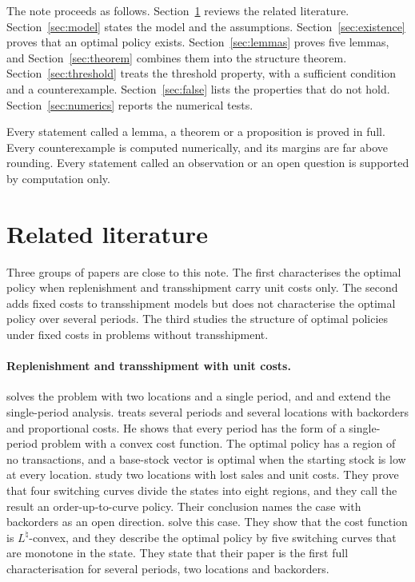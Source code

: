 \documentclass[11pt]{article}
\theoremstyle{definition}
\begin{document}
The note proceeds as follows. Section~\ref{sec:literature} reviews the related literature. Section~\ref{sec:model} states the model and the assumptions. Section~\ref{sec:existence} proves that an optimal policy exists. Section~\ref{sec:lemmas} proves five lemmas, and Section~\ref{sec:theorem} combines them into the structure theorem. Section~\ref{sec:threshold} treats the threshold property, with a sufficient condition and a counterexample. Section~\ref{sec:false} lists the properties that do not hold. Section~\ref{sec:numerics} reports the numerical tests.

Every statement called a lemma, a theorem or a proposition is proved in full. Every counterexample is computed numerically, and its margins are far above rounding. Every statement called an observation or an open question is supported by computation only.

\section{Related literature}\label{sec:literature}

Three groups of papers are close to this note. The first characterises the optimal policy when replenishment and transshipment carry unit costs only. The second adds fixed costs to transshipment models but does not characterise the optimal policy over several periods. The third studies the structure of optimal policies under fixed costs in problems without transshipment.

\paragraph{Replenishment and transshipment with unit costs.}
\citet{gross1963centralized} solves the problem with two locations and a single period, and \citet{das1975supply} and \citet{karmarkar1977one} extend the single-period analysis. \citet{karmarkar1981multiperiod} treats several periods and several locations with backorders and proportional costs. He shows that every period has the form of a single-period problem with a convex cost function. The optimal policy has a region of no transactions, and a base-stock vector is optimal when the starting stock is low at every location. \citet{abouee2015optimal} study two locations with lost sales and unit costs. They prove that four switching curves divide the states into eight regions, and they call the result an order-up-to-curve policy. Their conclusion names the case with backorders as an open direction. \citet{xu2023optimal} solve this case. They show that the cost function is $L^{\natural}$-convex, and they describe the optimal policy by five switching curves that are monotone in the state. They state that their paper is the first full characterisation for several periods, two locations and backorders.
\end{document}
